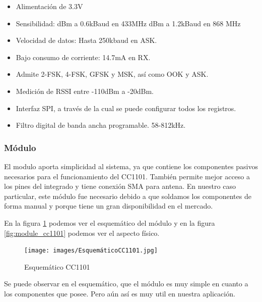 \begin{itemize}
    \item Alimentación de 3.3V
    \item Sensibilidad: 
     dBm a 0.6kBaud en 433MHz
     dBm a 1.2kBaud en 868 MHz
    \item Velocidad de datos: Hasta 250kbaud en ASK.
    \item Bajo consumo de corriente: 14.7mA en RX.
    \item Admite 2-FSK, 4-FSK, GFSK y MSK, así como OOK y ASK.
    \item Medición de RSSI entre -110dBm a -20dBm.
    \item Interfaz SPI, a través de la cual se puede configurar todos los registros.
    \item Filtro digital de banda ancha programable. 58-812kHz.
\end{itemize}

\subsubsection{Módulo}

El modulo aporta simplicidad al sistema, ya que contiene los componentes pasivos necesarios para el funcionamiento del CC1101. También permite mejor acceso a los pines 
del integrado y tiene conexión SMA para antena. En nuestro caso particular, este módulo fue necesario debido a que soldamos los componentes de forma manual y porque
tiene un gran disponibilidad en el mercado.

En la figura \ref{fig:sch_cc1101} podemos ver el esquemático del módulo y en la figura \ref{fig:module_cc1101} podemos ver el aspecto físico.

\begin{figure}[htb]
	\centering
	\texttt{[image: images/EsquemáticoCC1101.jpg]}
    \caption{Esquemático CC1101}
	\label{fig:sch_cc1101}
\end{figure}

Se puede observar en el esquemático, que el módulo es muy simple en cuanto a los componentes que posee. Pero aún así es muy util en nuestra aplicación.

